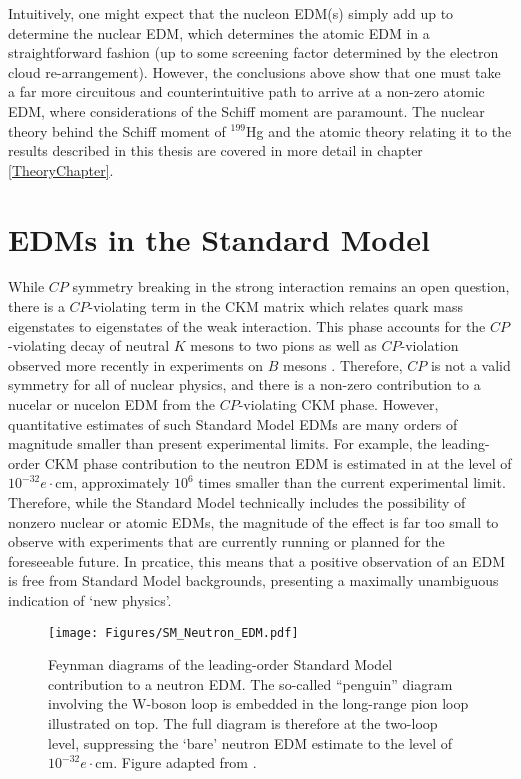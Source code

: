 \documentclass [10pt, twoside] {uwthesis}[2012/04/02]
\begin{document}
Intuitively, one might expect that the nucleon EDM(s) simply add up to determine the nuclear EDM, which determines the atomic EDM in a straightforward fashion (up to some screening factor determined by the electron cloud re-arrangement). However, the conclusions above show that one must take a far more circuitous and counterintuitive path to arrive at a non-zero atomic EDM, where considerations of the Schiff moment are paramount. The nuclear theory behind the Schiff moment of $^{199}$Hg and the atomic theory relating it to the results described in this thesis are covered in more detail in chapter \ref{TheoryChapter}.

\section{EDMs in the Standard Model}
While $CP$ symmetry breaking in the strong interaction remains an open question, there is a $CP$-violating term in the CKM matrix which relates quark mass eigenstates to eigenstates of the weak interaction. This phase accounts for the $CP$-violating decay of neutral $K$ mesons to two pions \cite{1964_Fitch_Cronin_CP_violating_Kaon_Decay} as well as $CP$-violation observed more recently in experiments on $B$ mesons \cite{2001_Belle_B_meson_CP_violation, 2001_BaBar_B_meson_CP_violation}. Therefore, $CP$ is not a valid symmetry for all of nuclear physics, and there is a non-zero contribution to a nucelar or nucelon EDM from the $CP$-violating CKM phase. However, quantitative estimates of such Standard Model EDMs are many orders of magnitude smaller than present experimental limits. For example, the leading-order CKM phase contribution to the neutron EDM is estimated in \cite{2005_Pospelov_Ritz_EDM_review} at the level of $10^{-32} e\cdot\text{cm}$, approximately $10^6$ times smaller than the current experimental limit. Therefore, while the Standard Model technically includes the possibility of nonzero nuclear or atomic EDMs, the magnitude of the effect is far too small to observe with experiments that are currently running or planned for the foreseeable future. In prcatice, this means that a positive observation of an EDM is free from Standard Model backgrounds, presenting a maximally unambiguous indication of `new physics'. 

\begin{figure}
\begin{center}
\texttt{[image: Figures/SM\_Neutron\_EDM.pdf]}
\end{center}
\caption[Leading-order neutron EDM contribution from Standard Model physics]%
{\narrower Feynman diagrams of the leading-order Standard Model contribution to a neutron EDM. The so-called ``penguin'' diagram involving the W-boson loop is embedded in the long-range pion loop illustrated on top. The full diagram is therefore at the two-loop level, suppressing the `bare' neutron EDM estimate to the level of $10^{-32} e\cdot\text{cm}$. Figure adapted from \cite{2005_Pospelov_Ritz_EDM_review}.}
\end{figure}
\end{document}

